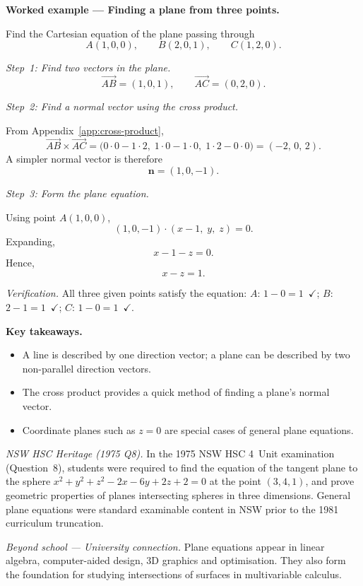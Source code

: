 \vspace{0.8em}
\noindent\textbf{Worked example --- Finding a plane from three
points.}

\noindent Find the Cartesian equation of the plane passing through
\[
  A(1, 0, 0), \qquad B(2, 0, 1), \qquad C(1, 2, 0).
\]

\vspace{0.3em}
\noindent\textit{Step~1: Find two vectors in the plane.}
\[
  \overrightarrow{AB} = (1, 0, 1),
  \qquad
  \overrightarrow{AC} = (0, 2, 0).
\]

\noindent\textit{Step~2: Find a normal vector using the cross
product.}

From Appendix~\ref{app:cross-product},
\[
  \overrightarrow{AB} \times \overrightarrow{AC}
  = \bigl(0\cdot 0 - 1\cdot 2,\;
         1\cdot 0 - 1\cdot 0,\;
         1\cdot 2 - 0\cdot 0\bigr)
  = (-2,\, 0,\, 2).
\]
A simpler normal vector is therefore
\[
  \mathbf{n} = (1, 0, -1).
\]

\noindent\textit{Step~3: Form the plane equation.}

Using point $A(1, 0, 0)$,
\[
  (1, 0, -1) \cdot (x - 1,\; y,\; z) = 0.
\]
Expanding,
\[
  x - 1 - z = 0.
\]
Hence,
\[
  \boxed{x - z = 1}.
\]

\noindent\textit{Verification.}
All three given points satisfy the equation:
$A$: $1 - 0 = 1$~$\checkmark$;\quad
$B$: $2 - 1 = 1$~$\checkmark$;\quad
$C$: $1 - 0 = 1$~$\checkmark$.

\vspace{0.8em}
\noindent\textbf{Key takeaways.}
\begin{itemize}[leftmargin=*,itemsep=2pt]
  \item A line is described by one direction vector; a plane can be
        described by two non-parallel direction vectors.
  \item The cross product provides a quick method of finding a
        plane's normal vector.
  \item Coordinate planes such as $z = 0$ are special cases of
        general plane equations.
\end{itemize}

\vspace{0.4em}
\noindent\textit{NSW HSC Heritage (1975 Q8).}
In the 1975 NSW HSC 4~Unit examination (Question~8), students were required to find the equation of the tangent plane to the sphere $x^2 + y^2 + z^2 - 2x - 6y + 2z + 2 = 0$ at the point $(3, 4, 1)$, and prove geometric properties of planes intersecting spheres in three dimensions. General plane equations were standard examinable content in NSW prior to the 1981 curriculum truncation.

\vspace{0.4em}
\noindent\textit{Beyond school --- University connection.}
Plane equations appear in linear algebra, computer-aided design,
3D graphics and optimisation.
They also form the foundation for studying intersections of surfaces
in multivariable calculus.

\endgroup
